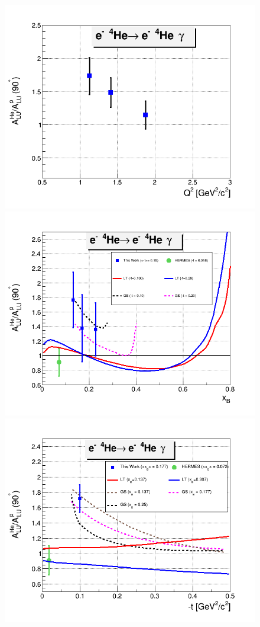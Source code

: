 \begin{figure}[tp]
\centering
\includegraphics[scale=0.37]{fig_ch5/coh_emc_Q2.png}\\
\includegraphics[scale=0.37]{fig_ch5/coh_emc_xB.png}\\
\includegraphics[scale=0.37]{fig_ch5/coh_emc_t.png}

\end{figure}
